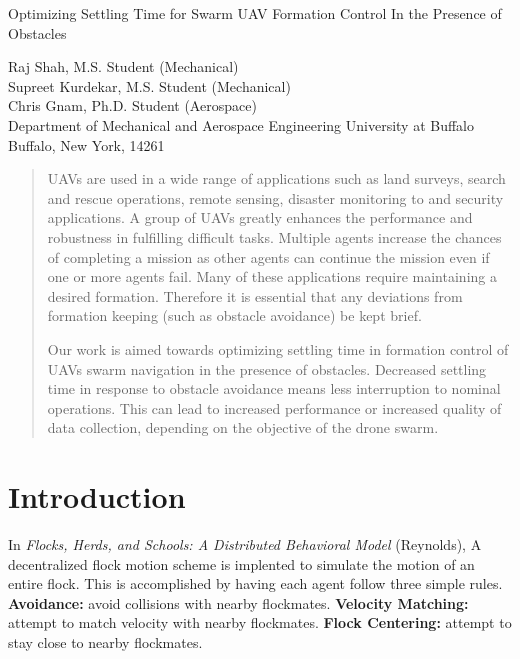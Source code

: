 \documentclass[11pt]{article}
\begin{document}
\begin{center}
{\footnotesize{\hvb
Optimizing Settling Time for Swarm UAV Formation Control In the Presence of Obstacles\\
}}

\vspace{10pt}
{\footnotesize
{\hvb Raj Shah}, {\hv M.S. Student (Mechanical)} \\
{\hvb Supreet Kurdekar}, {\hv M.S. Student (Mechanical)}\\
{\hvb Chris Gnam}, {\hv Ph.D. Student (Aerospace)} \\
{\hv
Department of Mechanical and Aerospace Engineering
University at Buffalo
Buffalo, New York, 14261
}}
\end{center}

\begin{abstract}

UAVs are used in a wide range of applications such as land surveys, search and rescue operations, remote sensing, disaster monitoring to and security applications. A group of UAVs greatly enhances the performance and robustness in fulfilling difficult tasks.  Multiple agents increase the chances of completing a mission as other agents can continue the mission even if one or more agents fail.  Many of these applications require maintaining a desired formation.  Therefore it is essential that any deviations from formation keeping (such as obstacle avoidance) be kept brief.  

Our work is aimed towards optimizing settling time in formation control of UAVs swarm navigation in the presence of obstacles.  Decreased settling time in response to obstacle avoidance means less interruption to nominal operations.  This can lead to increased performance or increased quality of data collection, depending on the objective of the drone swarm. 

\end{abstract}

\section{Introduction}
In \textit{Flocks, Herds, and Schools: A Distributed Behavioral Model } (Reynolds), A decentralized flock motion scheme is implented to simulate the motion of an entire flock.  This is accomplished by having each agent follow three simple rules.  \textbf{Avoidance:} avoid collisions with nearby flockmates.  \textbf{Velocity Matching:} attempt to match velocity with nearby flockmates.  \textbf{Flock Centering:} attempt to stay close to nearby flockmates.
\end{document}
